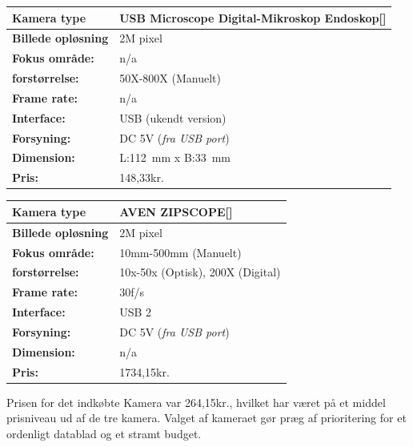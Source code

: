 \begin{center}
		\begin{longtable}{ | m{3cm} | m{9.5cm}| } 
			\hline
			\textbf{Kamera type} & USB Microscope Digital-Mikroskop Endoskop[\citet{DH9}] \\ 		
			\hline
			\textbf{Billede opløsning} & 2M pixel \\ 
			\hline
			\textbf{Fokus område:} & n/a  \\ 
			\hline
			\textbf{forstørrelse:} & 50X-800X (Manuelt)  \\ 
			\hline 
			\textbf{Frame rate:} & n/a  \\ 
			\hline
			\textbf{Interface:} & USB (ukendt version)  \\ 
			\hline
			\textbf{Forsyning:} & DC 5V (\textit{fra USB port})  \\ 
			\hline
			\textbf{Dimension:} & L:\SI{112}{\milli\metre} x B:\SI{33}{\milli\metre}  \\ 
			\hline	
			\textbf{Pris:} & 148,33kr.\\ 
			\hline
		\end{longtable}
	\end{center}
	
	\begin{center}
		\begin{longtable}{ | m{3cm} | m{9.5cm}| } 
			\hline
			\textbf{Kamera type} & AVEN ZIPSCOPE[\citet{DH10}] \\ 		
			\hline
			\textbf{Billede opløsning} & 2M pixel \\ 
			\hline
			\textbf{Fokus område:} &  10mm-500mm (Manuelt) \\ 
			\hline
			\textbf{forstørrelse:} & 10x-50x (Optisk), 200X (Digital)  \\ 
			\hline
			\textbf{Frame rate:} & 30f/s  \\ 
			\hline
			\textbf{Interface:} & USB 2  \\ 
			\hline
			\textbf{Forsyning:} & DC 5V (\textit{fra USB port})  \\ 
			\hline
			\textbf{Dimension:} & n/a \\ 
			\hline	
			\textbf{Pris:} & 1734,15kr.\\ 
			\hline
		\end{longtable}
	\end{center}
	
Prisen for det indkøbte Kamera var 264,15kr., hvilket har været på et middel prisniveau ud af de tre kamera. Valget af kameraet gør præg af prioritering for et ordenligt datablad og et stramt budget.

